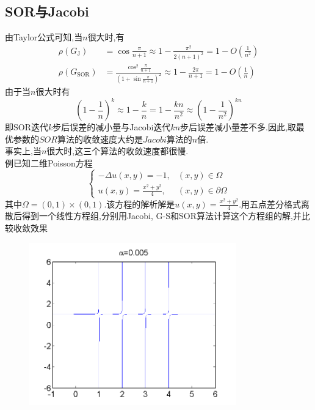 \documentclass[12pt,a4paper]{article}
\begin{document}
\subsection*{SOR与Jacobi}
由Taylor公式可知,当$n$很大时,有
$$
\begin{aligned} \rho\left(G_{\mathrm{J}}\right) &=\cos \frac{\pi}{n+1} \approx 1-\frac{\pi^{2}}{2(n+1)^{2}}=1-O\left(\frac{1}{n^{2}}\right) \\ \rho\left(G_{\mathrm{SOR}}\right) &=\frac{\cos ^{2} \frac{\pi}{n+1}}{\left(1+\sin \frac{\pi}{n+1}\right)^{2}} \approx 1-\frac{2 \pi}{n+1}=1-O\left(\frac{1}{n}\right) \end{aligned}
$$
由于当$n$很大时有
$$
\left(1-\frac{1}{n}\right)^{k} \approx 1-\frac{k}{n}=1-\frac{k n}{n^{2}} \approx\left(1-\frac{1}{n^{2}}\right)^{k n}
$$
即SOR迭代$k$步后误差的减小量与Jacobi迭代$kn$步后误差减小量差不多.因此,取最优参数的$SOR$算法的收敛速度大约是$Jacobi$算法的$n$倍.\\
事实上,当$n$很大时,这三个算法的收敛速度都很慢.\\
{\color{blue}例}\quad 已知二维Poisson方程
$$
\left\{\begin{array}{ll}
{-\Delta u(x, y)=-1,} & {(x, y) \in \Omega} \\ 
{u(x, y)=\frac{x^{2}+y^{2}}{4},} & {(x, y) \in \partial \Omega}\end{array}\right.
$$
其中$\Omega=(0,1) \times(0,1)$.该方程的解析解是$u(x, y)=\frac{x^{2}+y^{2}}{4}$.用五点差分格式离散后得到一个线性方程组,分别用Jacobi, G-S和SOR算法计算这个方程组的解,并比较收敛效果
\begin{figure}[h]
\centering 
\includegraphics[width=0.8\textwidth]{figurest/figure_3.png} 
\end{figure}
\end{document}
